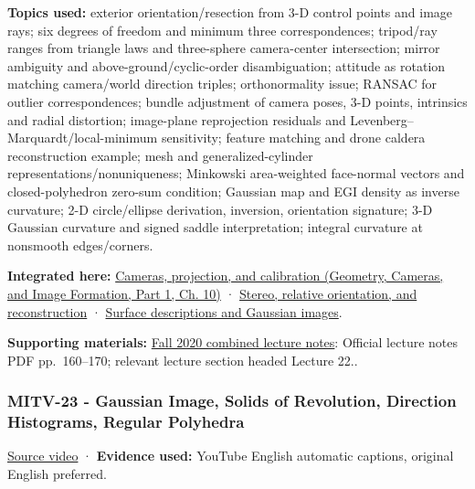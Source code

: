 \textbf{Topics used:} exterior orientation/resection from 3-D control points and image rays; six degrees of freedom and minimum three correspondences; tripod/ray ranges from triangle laws and three-sphere camera-center intersection; mirror ambiguity and above-ground/cyclic-order disambiguation; attitude as rotation matching camera/world direction triples; orthonormality issue; RANSAC for outlier correspondences; bundle adjustment of camera poses, 3-D points, intrinsics and radial distortion; image-plane reprojection residuals and Levenberg--Marquardt/local-minimum sensitivity; feature matching and drone caldera reconstruction example; mesh and generalized-cylinder representations/nonuniqueness; Minkowski area-weighted face-normal vectors and closed-polyhedron zero-sum condition; Gaussian map and EGI density as inverse curvature; 2-D circle/ellipse derivation, inversion, orientation signature; 3-D Gaussian curvature and signed saddle interpretation; integral curvature at nonsmooth edges/corners.

\textbf{Integrated here:} \href{../03-Geometry-Cameras-and-Image-Formation-P01/main.pdf\#03-visual-computing-i-ch003-cameras-projection-and-calibration}{Cameras, projection, and calibration (Geometry, Cameras, and Image Formation, Part 1, Ch. 10)} · \hyperref[04-visual-computing-ii-ch032-stereo-relative-orientation-and-reconstruction]{Stereo, relative orientation, and reconstruction} · \hyperref[04-visual-computing-ii-ch032-surface-descriptions-and-gaussian-images]{Surface descriptions and Gaussian images}.

\textbf{Supporting materials:} \href{https://ocw.mit.edu/courses/6-801-machine-vision-fall-2020/9ec44f69e72995c370b3797818ba01e6_MIT6_801F20_lectureNotes.pdf}{Fall 2020 combined lecture notes}: Official lecture notes PDF pp.~160--170; relevant lecture section headed Lecture 22..

\subsubsection{MITV-23 - Gaussian Image, Solids of Revolution, Direction Histograms, Regular Polyhedra}\label{04-visual-computing-ii-ch036-mitv-23---gaussian-image-solids-of-revolution-direction-histograms-regular-polyhedra}

\hypertarget{04-visual-computing-ii-ch036-mitv-23---gaussian-image-solids-of-revolution-direction-histograms-regular-polyhedra}{}

\href{https://www.youtube.com/watch?v=s9wu_z8EKAc}{Source video} · \textbf{Evidence used:} YouTube English automatic captions, original English preferred.

